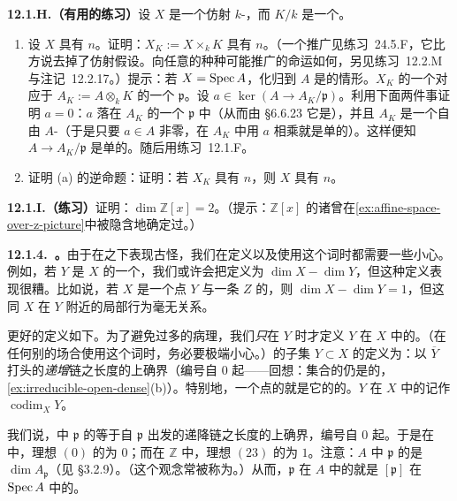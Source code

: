 \textbf{12.1.H.（有用的练习）}\quad 设 $X$ 是一个仿射 $k$-\trScheme，而 $K/k$ 是一个\trAlgebraic\trFieldExtension。
\begin{enumerate}[label=(\alph*)]
\item 设 $X$ 具有\trPureDimension{} $n$。证明：$X_K:=X\times_k K$ 具有\trPureDimension{} $n$。（一个推广见\mbox{练习~24.5.F}，它比方说去掉了仿射假设。向任意\trFieldExtension{}的种种可能推广的命运如何，另见\mbox{练习~12.2.M}与注记~12.2.17。）提示：若 $X=\operatorname{Spec} A$，化归到 $A$ 是\trIntegralDomain{}的情形。$X_K$ 的一个\trIrreducibleComponent{}对应于 $A_K:=A\otimes_k K$ 的一个\trMinimalPrime{} $\mathfrak{p}$。设 $a\in\ker(A\to A_K/\mathfrak{p})$。利用下面两件事证明 $a=0$：$a$ 落在 $A_K$ 的一个\trMinimalPrime{} $\mathfrak{p}$ 中（从而由 \S6.6.23 它是\trZerodivisor），并且 $A_K$ 是一个自由 $A$-\trModule（于是只要 $a\in A$ 非零，在 $A_K$ 中用 $a$ 相乘就是单的）。这样便知 $A\to A_K/\mathfrak{p}$ 是单的。随后用\mbox{练习~12.1.F}。
\item 证明 (a) 的逆命题：证明：若 $X_K$ 具有\trPureDimension{} $n$，则 $X$ 具有\trPureDimension{} $n$。
\end{enumerate}

\textbf{12.1.I.（练习）}\quad 证明：$\dim\mathbb{Z}[x]=2$。（提示：$\mathbb{Z}[x]$ 的诸\trPrimeIdeal{}曾在\cref{ex:affine-space-over-z-picture}中被隐含地确定过。）

\textbf{12.1.4.\ \trCodimension。}\quad 由于\trDimension{}在\trDisjointUnion{}之下表现古怪，我们在定义\trCodimension{}以及使用这个词时都需要一些小心。例如，若 $Y$ 是 $X$ 的一个\trClosedSubset，我们或许会把\trCodimension{}定义为 $\dim X-\dim Y$，但这种定义表现很糟。比如说，若 $X$ 是一个点 $Y$ 与一条\trCurve{} $Z$ 的\trDisjointUnion，则 $\dim X-\dim Y=1$，但这同 $X$ 在 $Y$ 附近的局部行为毫无关系。

更好的定义如下。为了避免过多的病理，我们\emph{只}在 $Y$ \trIrreducible{}时才定义 $Y$ 在 $X$ 中的\trCodimension。（在任何别的场合使用这个词时，务必要极端小心。）\trTopologicalSpace{}的\trIrreducible{}子集 $Y\subset X$ 的\textbf{\trCodimension}{}定义为：以 $\overline{Y}$ 打头的\trIrreducible{}\trClosedSubset{}\emph{递增}链之长度的上确界（编号自 $0$ 起——回想：\trIrreducible{}集合的\trClosure{}仍是\trIrreducible{}的，\cref{ex:irreducible-open-dense}(b)）。特别地，一个点的\textbf{\trCodimension}{}就是它的\trClosure{}的\trCodimension。$Y$ 在 $X$ 中的\trCodimension{}记作 $\operatorname{codim}_X Y$。

我们说，\trRing{}中\trPrimeIdeal{} $\mathfrak{p}$ 的\textbf{\trCodimension}{}等于自 $\mathfrak{p}$ 出发的递降\trPrimeIdeal{}链之长度的上确界，编号自 $0$ 起。于是在\trIntegralDomain{}中，理想 $(0)$ 的\trCodimension{}为 $0$；而在 $\mathbb{Z}$ 中，理想 $(23)$ 的\trCodimension{}为 $1$。注意：$A$ 中\trPrimeIdeal{} $\mathfrak{p}$ 的\trCodimension{}是 $\dim A_{\mathfrak{p}}$（见 \S3.2.9）。（这个观念常被称为\textbf{\trHeight}。）从而，$\mathfrak{p}$ 在 $A$ 中的\trCodimension{}就是 $[\mathfrak{p}]$ 在 $\operatorname{Spec} A$ 中的\trCodimension。

